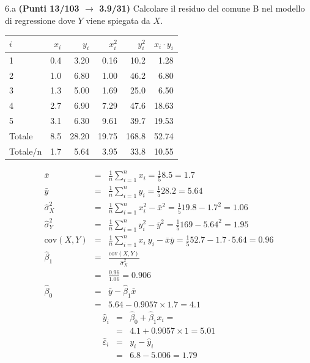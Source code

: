 \documentclass[
  11pt,
]{book}
\theoremstyle{mytheoremstyle}
\theoremstyle{mydefstyle}
\newenvironment{sol}
  {
  \begin{tcolorbox}[enhanced,breakable,arc=0.1mm,boxrule=1pt,colback=white,colframe=iblue,
  title=\bf \fontfamily{lmss}\selectfont \hspace{.5 cm} Soluzione,drop fuzzy shadow]

}{
\end{tcolorbox}
  }
\begin{document}
6.a \textbf{(Punti 13/103 \(\rightarrow\) 3.9/31)} Calcolare il residuo del comune B nel modello di regressione dove \(Y\) viene spiegata da \(X\).

\begin{sol}

\begin{table}[H]
\centering
\begin{tabular}{lrrrrr}
\toprule
$i$ & $x_i$ & $y_i$ & $x_i^2$ & $y_i^2$ & $x_i\cdot y_i$\\
\midrule
1 & 0.4 & 3.20 & 0.16 & 10.2 & 1.28\\
2 & 1.0 & 6.80 & 1.00 & 46.2 & 6.80\\
3 & 1.3 & 5.00 & 1.69 & 25.0 & 6.50\\
4 & 2.7 & 6.90 & 7.29 & 47.6 & 18.63\\
5 & 3.1 & 6.30 & 9.61 & 39.7 & 19.53\\
Totale & 8.5 & 28.20 & 19.75 & 168.8 & 52.74\\
Totale/n & 1.7 & 5.64 & 3.95 & 33.8 & 10.55\\
\bottomrule
\end{tabular}
\end{table}

\begin{eqnarray*}
           \bar x &=&\frac 1 n\sum_{i=1}^n x_i = \frac {1}{ 5 }  8.5 =  1.7 \\
           \bar y &=&\frac 1 n\sum_{i=1}^n y_i = \frac {1}{ 5 }  28.2 =  5.64 \\
           \hat\sigma_X^2&=&\frac 1 n\sum_{i=1}^n x_i^2-\bar x^2=\frac {1}{ 5 }  19.8  - 1.7 ^2= 1.06 \\
           \hat\sigma_Y^2&=&\frac 1 n\sum_{i=1}^n y_i^2-\bar y^2=\frac {1}{ 5 }  169  - 5.64 ^2= 1.95 \\
           \text{cov}(X,Y)&=&\frac 1 n\sum_{i=1}^n x_i~y_i-\bar x\bar y=\frac {1}{ 5 }  52.7 - 1.7 \cdot 5.64 = 0.96 \\
           \hat\beta_1 &=& \frac{\text{cov}(X,Y)}{\hat\sigma_X^2} \\
                    &=& \frac{ 0.96 }{ 1.06 }  =  0.906 \\
           \hat\beta_0 &=& \bar y - \hat\beta_1 \bar x\\
                    &=&  5.64 - 0.9057 \times  1.7 = 4.1 
         \end{eqnarray*}\begin{eqnarray*}
\hat y_i &=&\hat\beta_0+\hat\beta_1 x_i=\\ 
&=& 4.1 + 0.9057 \times 1 = 5.01 \\ 
\hat \varepsilon_i &=& y_i-\hat y_i\\ 
&=& 6.8 - 5.006 = 1.79  
\end{eqnarray*}

\end{sol}
\end{document}
